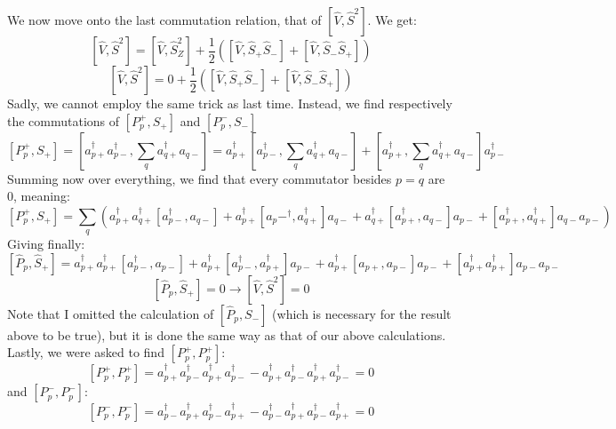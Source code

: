 \documentclass{article}
\begin{document}
We now move onto the last commutation relation, that of $\left[ \hat V, \hat S^2 \right]$. We get:
\begin{equation*}
    \left[ \hat V, \hat S^2 \right] = \left[ \hat V, \hat S_Z^2 \right] + \frac{1}{2} \left(\left[ \hat V, \hat S_+ \hat S_-\right] + \left[ \hat V, \hat S_- \hat S_+ \right]\right)
\end{equation*}
\begin{equation*}
    \left[ \hat V, \hat S^2 \right] = 0 + \frac{1}{2} \left(\left[ \hat V, \hat S_+ \hat S_-\right] + \left[ \hat V, \hat S_- \hat S_+ \right]\right)
\end{equation*}
Sadly, we cannot employ the same trick as last time. Instead, we find respectively the commutations of $\left[P_p^+, S_+ \right]$ and $\left[P_p^-, S_- \right]$
\begin{equation*}
    \left[P_p^+, S_+ \right] = \left[a_{p+}^\dagger a_{p-}^\dagger, \sum_q a_{q+}^\dagger a_{q-} \right] = a_{p+}^\dagger \left[a_{p-}^\dagger, \sum_q a_{q+}^\dagger a_{q-} \right] + \left[a_{p+}^\dagger, \sum_q a_{q+}^\dagger a_{q-} \right] a_{p-}^\dagger
\end{equation*}
Summing now over everything, we find that every commutator besides $p=q$ are 0, meaning:
\begin{equation*}
    \left[P_p^+, S_+ \right] =
    \sum_q \left( a_{p+}^\dagger a_{q+}^\dagger \left[a_{p-}^\dagger, a_{q-}\right] +
    a_{p+}^\dagger \left[a_p{-}^\dagger, a_{q+}^\dagger \right] a_{q-} +
    a_{q+}^\dagger \left[a_{p+}^\dagger, a_{q-}\right] a_{p-} + 
    \left[a_{p+}^\dagger, a_{q+}^\dagger \right]a_{q-} a_{p-}
    \right)
\end{equation*}
Giving finally:
\begin{equation*}
    \left[\hat P_p, \hat S_+ \right] = 
    a_{p+}^\dagger a_{p+}^\dagger \left[a_{p-}^\dagger, a_{p-} \right] + 
    a_{p+}^\dagger \left[a_{p-}^\dagger, a_{p+}^\dagger \right] a_{p-} + 
    a_{p+}^\dagger \left[a_{p+}, a_{p-} \right] a_{p-} +
    \left[a_{p+}^\dagger a_{p+}^\dagger \right] a_{p-} a_{p-}
\end{equation*}
\begin{equation}
    \left[\hat P_p, \hat S_+ \right] = 0 \xrightarrow[]{} \left[ \hat V, \hat S^2 \right] = 0
\end{equation}
Note that I omitted the calculation of $\left[\hat P_p, S_- \right]$ (which is necessary for the result above to be true), but it is done the same way as that of our above calculations. \newline
Lastly, we were asked to find $\left[P_p^+, P_p^+\right]$:
\begin{equation}
    \left[P_p^+, P_p^+\right] = a_{p+}^\dagger a_{p-}^\dagger a_{p+}^\dagger a_{p-}^\dagger - a_{p+}^\dagger a_{p-}^\dagger a_{p+}^\dagger a_{p-}^\dagger = 0
\end{equation}
and $\left[P_p^-, P_p^-\right]$:
\begin{equation}
    \left[P_p^-, P_p^-\right] = a_{p-}^\dagger a_{p+}^\dagger a_{p-}^\dagger a_{p+}^\dagger - a_{p-}^\dagger a_{p+}^\dagger a_{p-}^\dagger a_{p+}^\dagger = 0
\end{equation}
\end{document}
